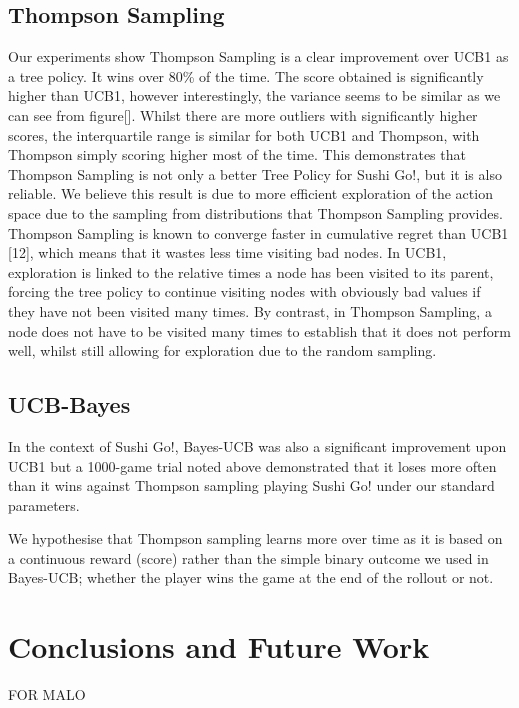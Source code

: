 \documentclass[conference]{IEEEtran}
\begin{document}
\subsection{Thompson Sampling}
Our experiments show Thompson Sampling is a clear improvement over UCB1 as a tree policy. It wins over 80\% of the time. The score obtained is significantly higher than UCB1, however interestingly, the variance seems to be similar as we can see from figure[]. Whilst there are more outliers with significantly higher scores, the interquartile range is similar for both UCB1 and Thompson, with Thompson simply scoring higher most of the time. This demonstrates that Thompson Sampling is not only a better Tree Policy for Sushi Go!, but it is also reliable.
We believe this result is due to more efficient exploration of the action space due to the sampling from distributions that Thompson Sampling provides. Thompson Sampling is known to converge faster in cumulative regret than UCB1 [12], which means that it wastes less time visiting bad nodes. In UCB1, exploration is linked to the relative times a node has been visited to its parent, forcing the tree policy to continue visiting nodes with obviously bad values if they have not been visited many times. By contrast, in Thompson Sampling, a node does not have to be visited many times to establish that it does not perform well, whilst still allowing for exploration due to the random sampling.

\subsection{UCB-Bayes}
In the context of Sushi Go!, Bayes-UCB was also a significant improvement upon UCB1 but a 1000-game trial noted above demonstrated that it loses more often than it wins against Thompson sampling playing Sushi Go! under our standard parameters.

We hypothesise that Thompson sampling learns more over time as it is based on a continuous reward (score) rather than the simple binary outcome we used in Bayes-UCB; whether the player wins the game at the end of the rollout or not.

\section{Conclusions and Future Work}
FOR MALO
\end{document}
